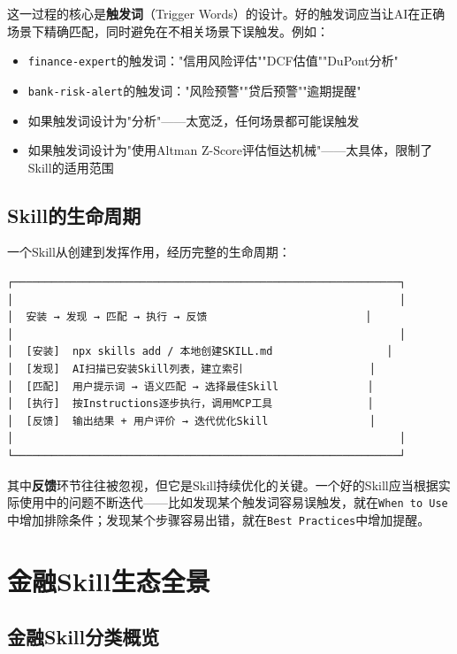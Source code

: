 这一过程的核心是\textbf{触发词}（Trigger Words）的设计。好的触发词应当让AI在正确场景下精确匹配，同时避免在不相关场景下误触发。例如：
\begin{itemize}[leftmargin=2em]
  \item \texttt{finance-expert}的触发词："信用风险评估""DCF估值""DuPont分析"
  \item \texttt{bank-risk-alert}的触发词："风险预警""贷后预警""逾期提醒"
  \item 如果触发词设计为"分析"——太宽泛，任何场景都可能误触发
  \item 如果触发词设计为"使用Altman Z-Score评估恒达机械"——太具体，限制了Skill的适用范围
\end{itemize}

\subsection{Skill的生命周期}

一个Skill从创建到发挥作用，经历完整的生命周期：

\begin{verbatim}
┌─────────────────────────────────────────────────────────────┐
│                                                             │
│  安装 → 发现 → 匹配 → 执行 → 反馈                         │
│                                                             │
│  [安装]  npx skills add / 本地创建SKILL.md                  │
│  [发现]  AI扫描已安装Skill列表，建立索引                    │
│  [匹配]  用户提示词 → 语义匹配 → 选择最佳Skill              │
│  [执行]  按Instructions逐步执行，调用MCP工具               │
│  [反馈]  输出结果 + 用户评价 → 迭代优化Skill                │
│                                                             │
└─────────────────────────────────────────────────────────────┘
\end{verbatim}

其中\textbf{反馈}环节往往被忽视，但它是Skill持续优化的关键。一个好的Skill应当根据实际使用中的问题不断迭代——比如发现某个触发词容易误触发，就在\texttt{When to Use}中增加排除条件；发现某个步骤容易出错，就在\texttt{Best Practices}中增加提醒。

\section{金融Skill生态全景}

\subsection{金融Skill分类概览}

